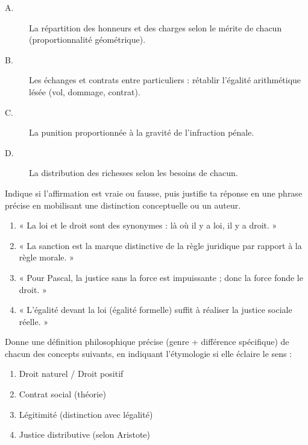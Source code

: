 \documentclass[11pt]{article}
\newcommand{\cle}[1]{{\popxbold\color{popdark}#1}}
\begin{document}
\begin{exercice}
\begin{enumerate}
    \begin{description}
        \item[A.] La répartition des honneurs et des charges selon le mérite de chacun (proportionnalité géométrique).
        \item[B.] Les échanges et contrats entre particuliers : rétablir l'égalité arithmétique lésée (vol, dommage, contrat).
        \item[C.] La punition proportionnée à la gravité de l'infraction pénale.
        \item[D.] La distribution des richesses selon les besoins de chacun.
    \end{description}
\end{enumerate}
\end{exercice}

\begin{exercice}
Indique si l'affirmation est vraie ou fausse, puis justifie ta réponse en une phrase précise en mobilisant une distinction conceptuelle ou un auteur.
\begin{enumerate}
    \item « La loi et le droit sont des synonymes : là où il y a loi, il y a droit. »
    \item « La sanction est la marque distinctive de la règle juridique par rapport à la règle morale. »
    \item « Pour Pascal, la justice sans la force est impuissante ; donc la force fonde le droit. »
    \item « L'égalité devant la loi (égalité formelle) suffit à réaliser la justice sociale réelle. »
\end{enumerate}
\end{exercice}

\begin{exercice}
Donne une définition philosophique précise (genre + différence spécifique) de chacun des concepts suivants, en indiquant l'étymologie si elle éclaire le sens :
\begin{enumerate}
    \item \cle{Droit naturel} / \cle{Droit positif}
    \item \cle{Contrat social} (théorie)
    \item \cle{Légitimité} (distinction avec légalité)
    \item \cle{Justice distributive} (selon Aristote)
\end{enumerate}
\end{exercice}
\end{document}
